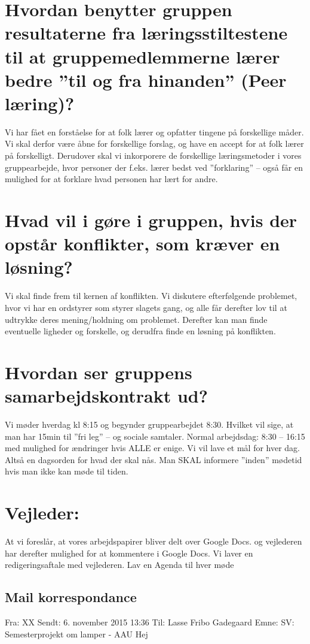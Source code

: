 \documentclass[oneside,a4paper,titlepage]{article}
\begin{document}
\section*{Hvordan benytter gruppen resultaterne fra læringsstiltestene til at gruppemedlemmerne lærer bedre ”til og fra hinanden” (Peer læring)?}
Vi har fået en forståelse for at folk lærer og opfatter tingene på forskellige måder. Vi skal derfor være åbne for forskellige forslag, og have en accept for at folk lærer på forskelligt. Derudover skal vi inkorporere de forskellige læringsmetoder i vores gruppearbejde, hvor personer der f.eks. lærer bedst ved ”forklaring” – også får en mulighed for at forklare hvad personen har lært for andre.
\section*{Hvad vil i gøre i gruppen, hvis der opstår konflikter, som kræver en løsning?}
Vi skal finde frem til kernen af konflikten. Vi diskutere efterfølgende problemet, hvor vi har en ordstyrer som styrer slagets gang, og alle får derefter lov til at udtrykke deres mening/holdning om problemet. Derefter kan man finde eventuelle ligheder og forskelle, og derudfra finde en løsning på konflikten.
\section*{Hvordan ser gruppens samarbejdskontrakt ud?}
Vi møder hverdag kl 8:15 og begynder gruppearbejdet 8:30. Hvilket vil sige, at man har 15min til ”fri leg” – og sociale samtaler.
Normal arbejdsdag: 8:30 – 16:15 med mulighed for ændringer hvis ALLE er enige.
Vi vil lave et mål for hver dag. Altså en dagsorden for hvad der skal nås.
Man SKAL informere ”inden” mødetid hvis man ikke kan møde til tiden.
\section*{Vejleder:}
At vi foreslår, at vores arbejdspapirer bliver delt over Google Docs. og vejlederen har derefter mulighed for at kommentere i Google Docs. Vi laver en redigeringsaftale med vejlederen.
Lav en Agenda til hver møde
\clearpage
\subsection{Mail korrespondance}
Fra: XX \newline
Sendt: 6. november 2015 13:36 \newline
Til: Lasse Fribo Gadegaard\newline
Emne: SV: Semesterprojekt om lamper - AAU\newline
Hej
 
\end{document}
